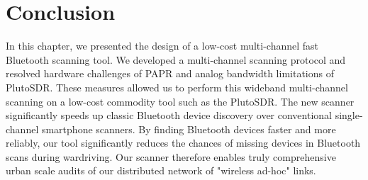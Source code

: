 \section{Conclusion}
\label{sec:hyperscanner:concl}
In this chapter, we presented the design of a low-cost multi-channel fast Bluetooth scanning tool. 
%
We developed a multi-channel scanning protocol and resolved hardware challenges of PAPR and analog bandwidth limitations of PlutoSDR.
%
These measures allowed us to perform this wideband multi-channel scanning on a low-cost commodity tool such as the PlutoSDR.
%
The new scanner significantly speeds up classic Bluetooth device discovery over conventional single-channel smartphone scanners.
%
By finding Bluetooth devices faster and more reliably, our tool significantly reduces the chances of missing devices in Bluetooth scans during wardriving.
%
Our scanner therefore enables truly comprehensive urban scale audits of our distributed network of "wireless ad-hoc" links.
